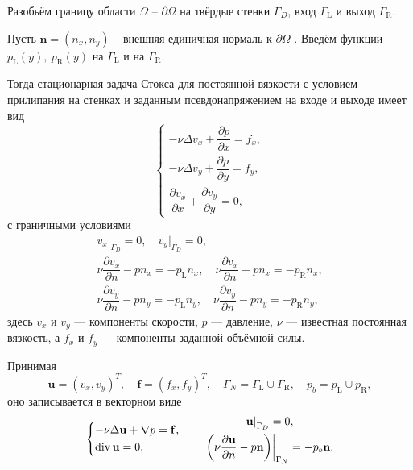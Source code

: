 \documentclass[a4paper,14pt]{extarticle}
\begin{document}
	Разобьём границу области $\Omega$ -- $\partial \Omega$  на твёрдые стенки $\Gamma_D$,
вход $\Gamma_{\mathrm{L}}$ и выход $\Gamma_{\mathrm{R}}$.


Пусть $\mathbf n = (n_x,n_y)$ -- внешняя единичная нормаль
к $\partial \Omega$ . Введём функции
$
	p_{\mathrm{L}}(y),~ p_{\mathrm{R}}(y)
$
на $\Gamma_{\mathrm{L}}$ и $\text{на } \Gamma_{\mathrm{R}}$.







Тогда стационарная задача Стокса для постоянной вязкости
с условием прилипания на стенках и заданным псевдонапряжением
на входе и выходе имеет вид
\begin{equation}
	\begin{cases}
		-\nu \Delta v_x
		+ \dfrac{\partial p}{\partial x}
		= f_x, \\

		-\nu \Delta v_y
		+ \dfrac{\partial p}{\partial y}
		= f_y, \\

		\dfrac{\partial v_x}{\partial x}
		+
		\dfrac{\partial v_y}{\partial y}
		= 0,
	\end{cases}
	\label{eq1}
	\end{equation}
	с граничными условиями
	\begin{equation}
		\begin{gathered}
		v_x \big |_{\Gamma_D} = 0,\quad
		v_y \big |_{\Gamma_D} = 0,\\
		\nu\dfrac{\partial v_x}{\partial n}
		- p n_x
		= -p_{\mathrm{L}} n_x, \quad
		\nu\dfrac{\partial v_x}{\partial n}
		- p n_x
		= -p_{\mathrm{R}} n_x, \\
		\nu\dfrac{\partial v_y}{\partial n}
		- p n_y
		= -p_{\mathrm{L}} n_y, \quad
		\nu\dfrac{\partial v_y}{\partial n}
		- p n_y
		= -p_{\mathrm{R}} n_y,
	\end{gathered}
	\end{equation}
	здесь $v_x$ и $v_y$ --- компоненты скорости,
	$p$ --- давление, $\nu$ --- известная постоянная вязкость,
	а $f_x$ и $f_y$ --- компоненты заданной объёмной силы.
	
	Принимая
	\begin{equation}
	{\mathbf u} = (v_x,v_y)^{T},\quad
	\mathbf f = (f_x, f_y)^{T},\quad
	\Gamma_{N} = \Gamma_{\mathrm{L}} \cup \Gamma_{\mathrm{R}}, \quad
	p_{b} = p_{\mathrm{L}} \cup p_{\mathrm{R}},
	\end{equation}
	оно записывается в векторном виде
	\begin{equation}
		\begin{dcases}
			-\nu\Delta{\mathbf u}
			+\nabla p
			=\mathbf f,
			\\
			\operatorname{div}{\mathbf u}=0,
		\end{dcases}
		\qquad
		\begin{gathered}
			\left.{\mathbf u}\right|_{\Gamma_D}=0,
			\\
			\left.
			\left(
			\nu\frac{\partial{\mathbf u}}{\partial n}
			-p\mathbf n
			\right)
			\right|_{\Gamma_N}
			=
			-p_b\mathbf n.
		\end{gathered}
		\label{eq:stokes_vector}
	\end{equation}
	
\end{document}
